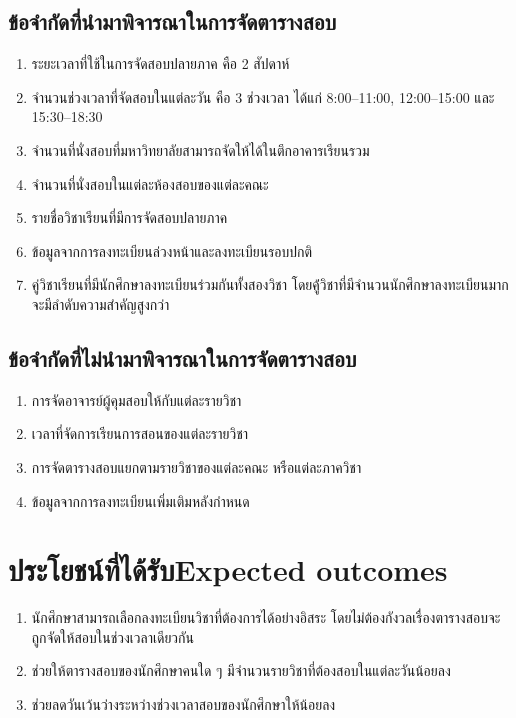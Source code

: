 \subsection{ข้อจำกัดที่นำมาพิจารณาในการจัดตารางสอบ}
\begin{enumerate}
    \item ระยะเวลาที่ใช้ในการจัดสอบปลายภาค คือ 2 สัปดาห์
    \item จำนวนช่วงเวลาที่จัดสอบในแต่ละวัน คือ 3 ช่วงเวลา ได้แก่ 8:00--11:00, 12:00--15:00 
    และ 15:30--18:30
    \item จำนวนที่นั่งสอบที่มหาวิทยาลัยสามารถจัดให้ได้ในตึกอาคารเรียนรวม
    \item จำนวนที่นั่งสอบในแต่ละห้องสอบของแต่ละคณะ
    \item รายชื่อวิชาเรียนที่มีการจัดสอบปลายภาค
    \item ข้อมูลจากการลงทะเบียนล่วงหน้าและลงทะเบียนรอบปกติ
    \item คู่วิชาเรียนที่มีนักศึกษาลงทะเบียนร่วมกันทั้งสองวิชา โดยคู้่วิชาที่มีจำนวนนักศึกษาลงทะเบียนมาก จะมีลำดับความสำคัญสูงกว่า
\end{enumerate}

\subsection{ข้อจำกัดที่ไม่นำมาพิจารณาในการจัดตารางสอบ}
\begin{enumerate}
    \item การจัดอาจารย์ผู้คุมสอบให้กับแต่ละรายวิชา
    \item เวลาที่จัดการเรียนการสอนของแต่ละรายวิชา
    \item การจัดตารางสอบแยกตามรายวิชาของแต่ละคณะ หรือแต่ละภาควิชา
    \item ข้อมูลจากการลงทะเบียนเพิ่มเติมหลังกำหนด
\end{enumerate}

\section{\ifcpe ประโยชน์ที่ได้รับ\else Expected outcomes\fi}
\begin{enumerate}
    \item นักศึกษาสามารถเลือกลงทะเบียนวิชาที่ต้องการได้อย่างอิสระ โดยไม่ต้องกังวลเรื่องตารางสอบจะถูกจัดให้สอบในช่วงเวลาเดียวกัน
    \item ช่วยให้ตารางสอบของนักศึกษาคนใด ๆ มีจำนวนรายวิชาที่ต้องสอบในแต่ละวันน้อยลง
    \item ช่วยลดวันเว้นว่างระหว่างช่วงเวลาสอบของนักศึกษาให้น้อยลง 
\end{enumerate}

